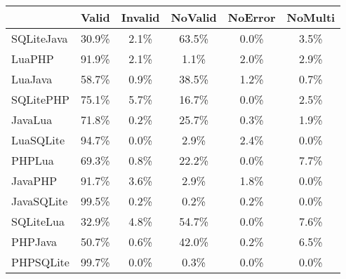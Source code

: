 \begin{tabular}{l  c  c  c  c  c }
    \toprule
        & Valid & Invalid & NoValid & NoError & NoMulti \\
    \midrule
    SQLiteJava & 30.9\% & 2.1\% & 63.5\% & 0.0\% & 3.5\% \\
    LuaPHP & 91.9\% & 2.1\% & 1.1\% & 2.0\% & 2.9\% \\
    LuaJava & 58.7\% & 0.9\% & 38.5\% & 1.2\% & 0.7\% \\
    SQLitePHP & 75.1\% & 5.7\% & 16.7\% & 0.0\% & 2.5\% \\
    JavaLua & 71.8\% & 0.2\% & 25.7\% & 0.3\% & 1.9\% \\
    LuaSQLite & 94.7\% & 0.0\% & 2.9\% & 2.4\% & 0.0\% \\
    PHPLua & 69.3\% & 0.8\% & 22.2\% & 0.0\% & 7.7\% \\
    JavaPHP & 91.7\% & 3.6\% & 2.9\% & 1.8\% & 0.0\% \\
    JavaSQLite & 99.5\% & 0.2\% & 0.2\% & 0.2\% & 0.0\% \\
    SQLiteLua & 32.9\% & 4.8\% & 54.7\% & 0.0\% & 7.6\% \\
    PHPJava & 50.7\% & 0.6\% & 42.0\% & 0.2\% & 6.5\% \\
    PHPSQLite & 99.7\% & 0.0\% & 0.3\% & 0.0\% & 0.0\% \\
    \bottomrule
\end{tabular}
        
